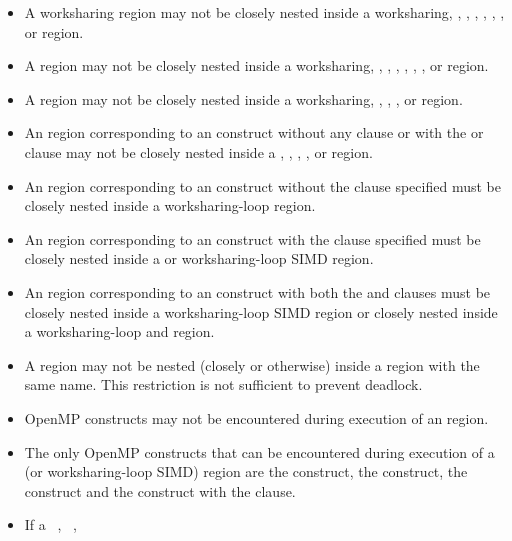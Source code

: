 \begin{itemize}
\item A worksharing region may not be closely nested inside a worksharing,
      , , , , ,
      , or  region.
\item A  region may not be closely nested inside a worksharing,
      , , , , ,
      , or  region.
\item A  region may not be closely nested inside a worksharing,
      , , , or  region.
\item An  region corresponding to an  construct
      without any clause or with the  or  clause 
      may not be closely nested inside a , , 
      , , or  region.
\item An  region corresponding to an  construct 
      without the  clause specified must be closely nested inside 
      a worksharing-loop region.
\item An  region corresponding to an  construct 
      with the  clause specified must be closely nested inside a 
       or worksharing-loop SIMD region.
\item An  region corresponding to an  construct 
      with both the  and  clauses must be closely 
      nested inside a worksharing-loop SIMD region or closely nested inside 
      a worksharing-loop and  region.
\item A  region may not be nested (closely or otherwise) inside 
      a  region with the same name. This restriction is not 
      sufficient to prevent deadlock.
\item OpenMP constructs may not be encountered during execution of an
       region.
\item The only OpenMP constructs that can be encountered during execution of a
       (or worksharing-loop SIMD) region are the  construct,
      the  construct, the  construct and the  
      construct with the  clause.
\item If a ~, ~,

\end{itemize}

